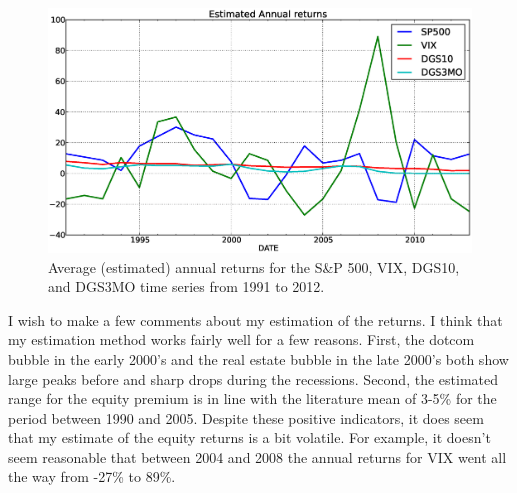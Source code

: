 \documentclass[a4paper, 11pt, twoside]{article}
\theoremstyle{definition} %
\numberwithin{equation}{section}
\begin{document}
  \begin{figure}[!h]
    \centering
    \includegraphics[width=6in]{./Figures/returns.eps}
    \captionsetup{width=5.5in}
    \caption{\small Average (estimated) annual returns for the S\&P 500, VIX, DGS10, and DGS3MO time series from 1991 to 2012.}
    \label{fig:returns}
  \end{figure}

  I wish to make a few comments about my estimation of the returns. I think that my estimation method works fairly well for a few reasons. First, the dotcom bubble in the early 2000's and the real estate bubble in the late 2000's both show large peaks before and sharp drops during the recessions. Second, the estimated range for the equity premium is in line with the literature mean of 3-5\% \citep{dimsonm:2006} for the period between 1990 and 2005. Despite these positive indicators, it does seem that my estimate of the equity returns is a bit volatile.  For example, it doesn't seem reasonable that between 2004 and 2008 the annual returns for VIX went all the way from -27\% to 89\%.
\end{document}
